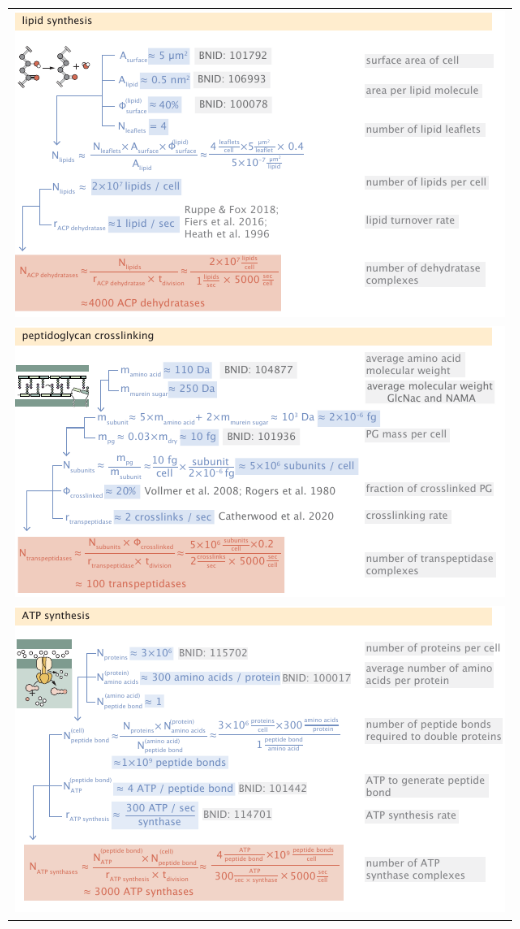 \begin{longtable}{c}
\includegraphics{SI_estimates/lipid_synthesis.pdf}  \\
\includegraphics{SI_estimates/pg_synthesis.pdf}  \\
\includegraphics{SI_estimates/atp_synthesis.pdf}  \\

\end{longtable}
